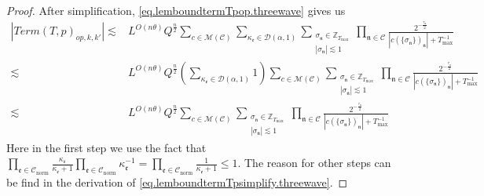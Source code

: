 \begin{proof}
After simplification, \eqref{eq.lemboundtermTpop.threewave} gives us 
\begin{equation}
\begin{split}
    |Term(T, p)_{op,k,k'}|\lesssim &L^{O(n\theta)} Q^{\frac{n}{2}}\sum_{c\in \mathscr{M}(\mathcal{C}) }\sum_{\kappa_{\mathfrak{e}}\in \mathcal{D}(\alpha,1)}\sum_{\substack{\sigma_{\mathfrak{n}}\in \mathbb{Z}_{T_{\text{max}}}\\ |\sigma_{\mathfrak{n}}|\lesssim 1}} \prod_{\mathfrak{n}\in \mathcal{C}}\frac{2^{-\frac{\tau_{\mathfrak{n}}}{2}}}{|c(\{\sigma_{\mathfrak{n}}\})_{\mathfrak{n}}|+T^{-1}_{\text{max}}}
    \\
    \lesssim &L^{O(n\theta)} Q^{\frac{n}{2}} \left(\sum_{\kappa_{\mathfrak{e}}\in \mathcal{D}(\alpha,1)} 1\right) \sum_{c\in \mathscr{M}(\mathcal{C})}\sum_{\substack{\sigma_{\mathfrak{n}}\in \mathbb{Z}_{T_{\text{max}}}\\ |\sigma_{\mathfrak{n}}|\lesssim 1}} \prod_{\mathfrak{n}\in \mathcal{C}}\frac{2^{-\frac{\tau_{\mathfrak{n}}}{2}}}{|c(\{\sigma_{\mathfrak{n}}\})_{\mathfrak{n}}|+T^{-1}_{\text{max}}}
    \\
    \lesssim & L^{O(n\theta)} Q^{\frac{n}{2}} \sum_{c\in \mathscr{M}(\mathcal{C})}\sum_{\substack{\sigma_{\mathfrak{n}}\in \mathbb{Z}_{T_{\text{max}}}\\ |\sigma_{\mathfrak{n}}|\lesssim 1}} \prod_{\mathfrak{n}\in \mathcal{C}}\frac{2^{-\frac{\tau_{\mathfrak{n}}}{2}}}{|c(\{\sigma_{\mathfrak{n}}\})_{\mathfrak{n}}|+T^{-1}_{\text{max}}}
\end{split}
\end{equation}
Here in the first step we use the fact that $\prod_{\mathfrak{e}\in \mathcal{C}_{\text{norm}}} \frac{\kappa_{\mathfrak{e}}}{\kappa_{\mathfrak{e}}+1} \prod_{\mathfrak{e}\in \mathcal{C}_{\text{norm}}} \kappa_{\mathfrak{e}}^{-1}=\prod_{\mathfrak{e}\in \mathcal{C}_{\text{norm}}} \frac{1}{\kappa_{\mathfrak{e}}+1}\le 1$. The reason for other steps can be find in the derivation of \eqref{eq.lemboundtermTpsimplify.threewave}.


\end{proof}
